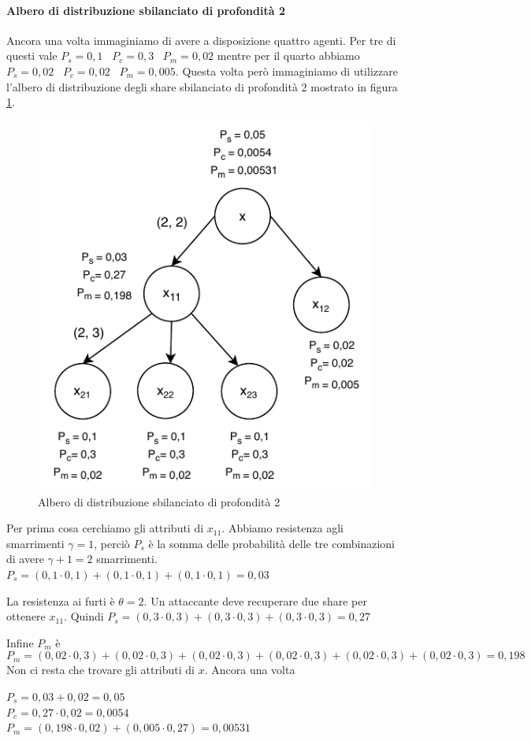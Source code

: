 \paragraph{Albero di distribuzione sbilanciato di profondità 2}
Ancora una volta immaginiamo di avere a disposizione quattro agenti. Per tre di questi
vale
$ P_s = 0,1 $ \,
$ P_c = 0,3 $ \,
$ P_m = 0,02 $
mentre per il quarto abbiamo
$ P_s = 0,02 $ \,
$ P_c = 0,02 $ \,
$ P_m = 0,005 $.
Questa volta però immaginiamo di utilizzare l'albero di distribuzione degli share
sbilanciato di profondità 2
mostrato in figura \ref{fig:robustezza-2-3}.
\begin{figure}[H]
	\centering
	\includegraphics[width=0.55\linewidth]{images/chap_analisi_robustezza/robustezza-2-3.pdf}
	\caption{Albero di distribuzione sbilanciato di profondità 2}
	\label{fig:robustezza-2-3}
\end{figure}
Per prima cosa cerchiamo gli attributi di $ x_{11} $.
Abbiamo resistenza agli smarrimenti $ \gamma = 1 $, perciò $ P_s $
è la somma delle probabilità delle tre combinazioni di avere $ \gamma + 1 = 2 $ smarrimenti.
$ P_s = (0,1 \cdot 0,1) + (0,1 \cdot 0,1) + (0,1 \cdot 0,1) = 0,03 $

La resistenza ai furti è $ \theta = 2 $. Un attaccante deve recuperare
due share per ottenere $ x_{11} $. Quindi
$ P_s = (0,3 \cdot 0,3) + (0,3 \cdot 0,3) + (0,3 \cdot 0,3) = 0,27 $

Infine $ P_m $ è
$$
	P_m = (0,02 \cdot 0,3) + (0,02 \cdot 0,3) +
	(0,02 \cdot 0,3) + (0,02 \cdot 0,3) +
	(0,02 \cdot 0,3) + (0,02 \cdot 0,3) = 0,198
$$
Non ci resta che trovare gli attributi di $ x $.
Ancora una volta
\begin{tightcenter}
	$ P_s = 0,03 + 0,02 = 0,05 $      \\
	$ P_c = 0,27 \cdot 0,02 = 0,0054 $\\
	$ P_m = (0,198 \cdot 0,02) + (0,005 \cdot 0,27) = 0,00531 $
\end{tightcenter}



